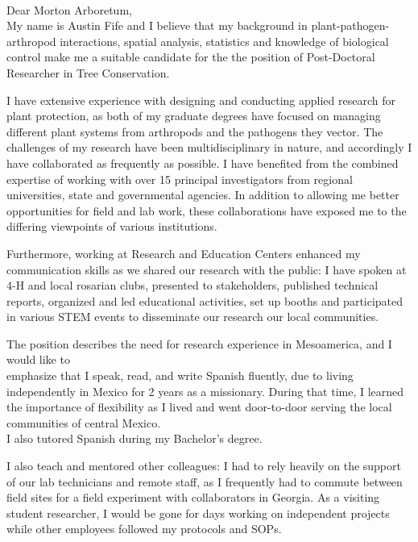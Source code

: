 \documentclass[11pt]{letter} %
\begin{document}
\begin{letter}
\\
Dear Morton Arboretum,\\

My name is Austin Fife and I believe that my background in plant-pathogen-arthropod interactions, spatial analysis, statistics and knowledge of biological control make me a suitable candidate for the the position of Post-Doctoral Researcher in Tree Conservation.

I have extensive experience with designing and conducting applied research for plant protection, as both of my graduate degrees have focused on managing different plant systems from arthropods and the pathogens they vector. The challenges of my research have been multidisciplinary in nature, and accordingly I have collaborated as frequently as possible. I have benefited from the combined expertise of working with over 15 principal investigators from regional universities, state and governmental agencies. In addition to allowing me better opportunities for field and lab work, these collaborations have exposed me to the differing viewpoints of various institutions.

Furthermore, working at Research and Education Centers enhanced my communication skills as we shared our research with the public: I have spoken at 4-H and local rosarian clubs, presented to stakeholders, published technical reports, organized and led educational activities, set up booths and participated in various STEM events to disseminate our research our local communities.

The position describes the need for research experience in Mesoamerica, and I would like to\\
emphasize that I speak, read, and write Spanish fluently, due to living independently in Mexico for 2 years as a missionary. During that time, I learned the importance of  flexibility as I lived and went door-to-door serving the local communities of central Mexico.\\
I also tutored Spanish during my Bachelor's degree.

I also teach and mentored other colleagues: I had to rely heavily on the support of our lab technicians and remote staff, as I frequently had to commute between field sites for a field experiment with collaborators in Georgia. As a visiting student researcher, I would be gone for days working on independent projects while other employees followed my protocols and SOPs.


\end{letter}
\end{document}
